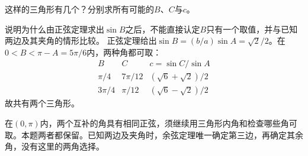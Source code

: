 \quad {}这样的三角形有几个？分别求所有可能的\(B\)、\(C\)与\(c\)。

\quad {}说明为什么由正弦定理求出\(\sin B\)之后，不能直接认定\(B\)只有一个取值，并与已知两边及其夹角的情形比较。
\solutionanswer
{}正弦定理给出\(\sin B=(b/a)\sin A=\sqrt2/2\)。在\(0<B<\pi-A=5\pi/6\)内，两种角都可取：
\[
\begin{array}{c|c|c}
B&C&c=\sin C/\sin A\\\hline
\pi/4&7\pi/12&(\sqrt6+\sqrt2)/2\\
3\pi/4&\pi/12&(\sqrt6-\sqrt2)/2
\end{array}
\]
故共有两个三角形。

在\((0,\pi)\)内，两个互补的角具有相同正弦，须继续用三角形内角和检查哪些角可取。本题两者都保留。已知两边及夹角时，余弦定理唯一确定第三边，再确定其余角，没有这里的两角选择。
\par
